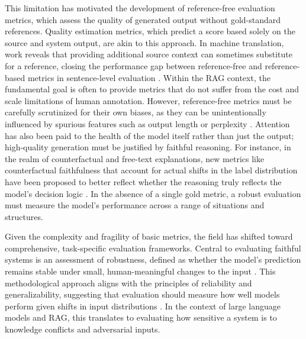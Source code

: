 \documentclass[11pt]{article}
\begin{document}
This limitation has motivated the development of reference-free evaluation metrics, which assess the quality of generated output without gold-standard references. Quality estimation metrics, which predict a score based solely on the source and system output, are akin to this approach. In machine translation, work reveals that providing additional source context can sometimes substitute for a reference, closing the performance gap between reference-free and reference-based metrics in sentence-level evaluation \cite{ref408}. Within the RAG context, the fundamental goal is often to provide metrics that do not suffer from the cost and scale limitations of human annotation. However, reference-free metrics must be carefully scrutinized for their own biases, as they can be unintentionally influenced by spurious features such as output length or perplexity \cite{ref405}. Attention has also been paid to the health of the model itself rather than just the output; high-quality generation must be justified by faithful reasoning. For instance, in the realm of counterfactual and free-text explanations, new metrics like counterfactual faithfulness that account for actual shifts in the label distribution have been proposed to better reflect whether the reasoning truly reflects the model's decision logic \cite{ref409}. In the absence of a single gold metric, a robust evaluation must measure the model's performance across a range of situations and structures.

Given the complexity and fragility of basic metrics, the field has shifted toward comprehensive, task-specific evaluation frameworks. Central to evaluating faithful systems is an assessment of robustness, defined as whether the model's prediction remains stable under small, human-meaningful changes to the input \cite{ref410}. This methodological approach aligns with the principles of reliability and generalizability, suggesting that evaluation should measure how well models perform given shifts in input distributions \cite{ref411}. In the context of large language models and RAG, this translates to evaluating how sensitive a system is to knowledge conflicts and adversarial inputs.
\end{document}
